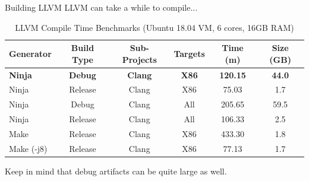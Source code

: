 \documentclass{beamer}
\begin{document}
\begin{frame}{Building LLVM}
    LLVM can take a while to compile...

    \begin{table}
        \footnotesize
        \centering
        \begin{tabular}{l c c c | c c}
            \toprule
            Generator & Build Type & Sub-Projects & Targets & Time (m) & Size (GB) \\
            \toprule
            \textbf{Ninja} & \textbf{Debug} & \textbf{Clang} & \textbf{X86} & \textbf{120.15} & \textbf{44.0} \\
            Ninja      & Release & Clang & X86 & 75.03  & 1.7  \\
            Ninja      & Debug   & Clang & All & 205.65 & 59.5 \\
            Ninja      & Release & Clang & All & 106.33 & 2.5  \\
            Make       & Release & Clang & X86 & 433.30 & 1.8  \\
            Make (-j8) & Release & Clang & X86 & 77.13  & 1.7  \\
            \bottomrule
        \end{tabular}
        \caption{\footnotesize LLVM Compile Time Benchmarks (Ubuntu 18.04 VM, 6 cores, 16GB RAM)}
    \end{table}

    Keep in mind that debug artifacts can be quite large as well.
\end{frame}
\end{document}
